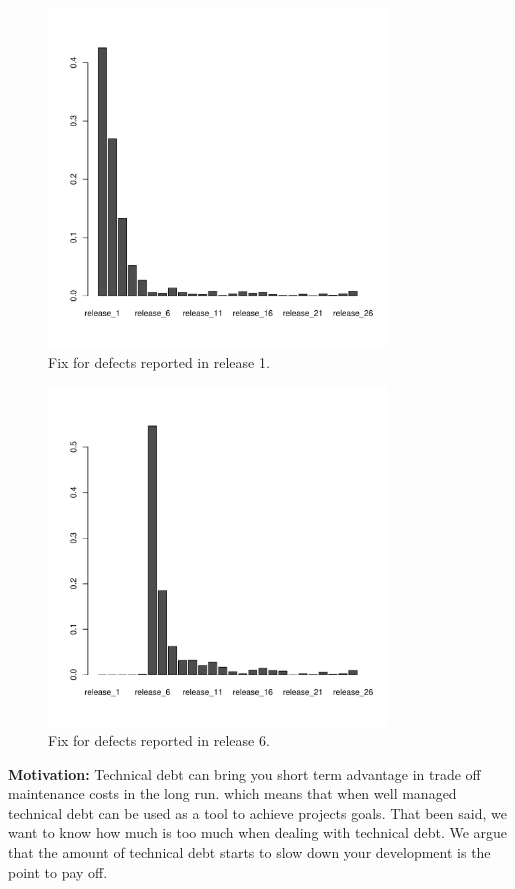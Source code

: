  
\begin{figure}[thb!]
    \caption{Fix for defects reported in release 1.}
    \label{fig:defect_release_1}
    \includegraphics[width=90mm,scale=0.5]{figures/r1}
\end{figure}

\begin{figure}[thb!]
    \caption{Fix for defects reported in release 6.}
    \label{fig:defect_release_6}
    \includegraphics[width=90mm,scale=0.5]{figures/r6}
\end{figure}

\vspace{3mm}
\noindent\rqii
\vspace{3mm}

\noindent\textbf{Motivation:} Technical debt can bring you short term advantage in trade off maintenance costs in the  long run. which means that when well managed technical debt can be used as a tool to achieve projects goals. That been said, we want to know how much is too much when dealing with technical debt. We argue that the amount of technical debt starts to slow down your development is the point to pay off. 

